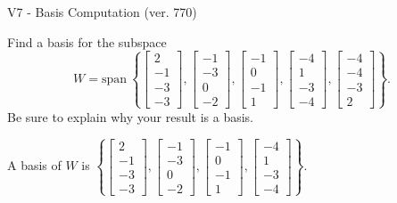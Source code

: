 \begin{exercise}
  \begin{exerciseTitle}V7 - Basis Computation (ver. 770)\end{exerciseTitle}
  \begin{exerciseStatement}
    Find a basis for the subspace 
\[W=\mathrm{span}\ \left\{\left[\begin{array}{r}
2 \\
-1 \\
-3 \\
-3
\end{array}\right] , \left[\begin{array}{r}
-1 \\
-3 \\
0 \\
-2
\end{array}\right] , \left[\begin{array}{r}
-1 \\
0 \\
-1 \\
1
\end{array}\right] , \left[\begin{array}{r}
-4 \\
1 \\
-3 \\
-4
\end{array}\right] , \left[\begin{array}{r}
-4 \\
-4 \\
-3 \\
2
\end{array}\right]\right\}.\]
 Be sure to explain why your result is a basis.


  \end{exerciseStatement}
  \begin{exerciseAnswer}
   A basis of \(W\) is  \(\left\{\left[\begin{array}{r}
2 \\
-1 \\
-3 \\
-3
\end{array}\right] , \left[\begin{array}{r}
-1 \\
-3 \\
0 \\
-2
\end{array}\right] , \left[\begin{array}{r}
-1 \\
0 \\
-1 \\
1
\end{array}\right] , \left[\begin{array}{r}
-4 \\
1 \\
-3 \\
-4
\end{array}\right]\right\}\).
  


  \end{exerciseAnswer}
\end{exercise}